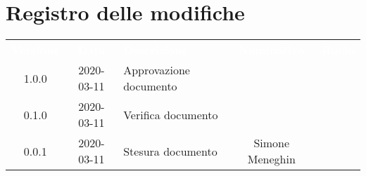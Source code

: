 \section*{Registro delle modifiche}
{
	\centering
	\begin{longtable}{ c c  C{4cm}  c  c }
		\textcolor{white}{\textbf{Versione}} & \textcolor{white}{\textbf{Data}} & \textcolor{white}{\textbf{Descrizione}} & \textcolor{white}{\textbf{Nominativo}} & \textcolor{white}{\textbf{Ruolo}}\\		
		1.0.0 & 2020-03-11 & Approvazione documento &  &\RdP{}\\		
		0.1.0 & 2020-03-11 & Verifica documento &  &\ver{}\\		
		0.0.1 & 2020-03-11 & Stesura documento & Simone Meneghin &\reda{}\\		
		
	\end{longtable}

}